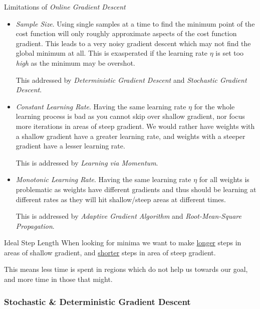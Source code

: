 \documentclass[11pt,a4paper]{article}
\begin{document}
  \begin{remark}{Limitations of \textit{Online Gradient Descent}}
    \begin{itemize}
      \item \textit{Sample Size}. Using single samples at a time to find the minimum point of the cost function will only roughly approximate aspects of the cost function gradient. This leads to a very noisy gradient descent which may not find the global minimum at all. This is exasperated if the learning rate $\eta$ is set too \textit{high} as the minimum may be overshot.
      \par This addressed by \textit{Deterministic Gradient Descent} and \textit{Stochastic Gradient Descent}.
      \item \textit{Constant Learning Rate}. Having the same learning rate $\eta$ for the whole learning process is bad as you cannot skip over shallow gradient, nor focus more iterations in areas of steep gradient. We would rather have weights with a shallow gradient have a greater learning rate, and weights with a steeper gradient have a lesser learning rate.
      \par This is addressed by \textit{Learning via Momentum}.
      \item \textit{Monotonic Learning Rate}. Having the same learning rate $\eta$ for all weights is problematic as weights have different gradients and thus should be learning at different rates as they will hit shallow/steep areas at different times.
      \par This is addressed by \textit{Adaptive Gradient Algorithm} and \textit{Root-Mean-Square Propagation}.
    \end{itemize}
  \end{remark}

  \begin{remark}{Ideal Step Length}
    When looking for minima we want to make \underline{longer} steps in areas of shallow gradient, and \underline{shorter} steps in area of steep gradient.
    \par This means less time is spent in regions which do not help us towards our goal, and more time in those that might.
  \end{remark}

\subsubsection{Stochastic \& Deterministic Gradient Descent} \label{sec_SDGD}
\end{document}
